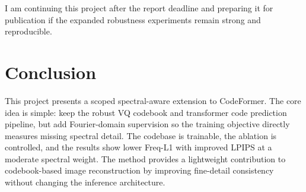 \documentclass[10pt,twocolumn,letterpaper]{article}
\begin{document}
I am continuing this project after the report deadline and preparing it for publication if the expanded robustness experiments remain strong and reproducible.

\section{Conclusion}
This project presents a scoped spectral-aware extension to CodeFormer. The core idea is simple: keep the robust VQ codebook and transformer code prediction pipeline, but add Fourier-domain supervision so the training objective directly measures missing spectral detail. The codebase is trainable, the ablation is controlled, and the results show lower Freq-L1 with improved LPIPS at a moderate spectral weight. The method provides a lightweight contribution to codebook-based image reconstruction by improving fine-detail consistency without changing the inference architecture.

{\small


}
\end{document}
